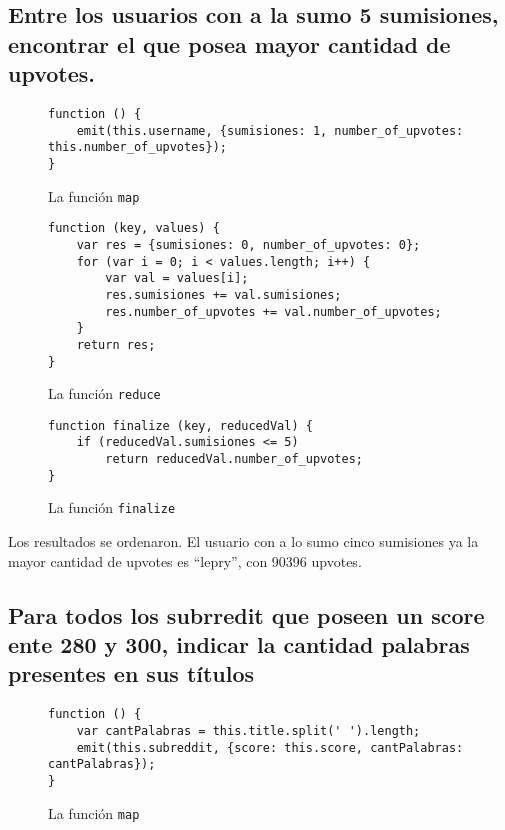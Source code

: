 \documentclass[11pt, a4paper, twoside]{article}
\begin{document}
\subsection{Entre los usuarios con a la sumo 5 sumisiones, encontrar el que posea mayor cantidad de upvotes.}

\begin{figure}[H]
\centering
\begin{verbatim}
function () {
    emit(this.username, {sumisiones: 1, number_of_upvotes: this.number_of_upvotes});
}
\end{verbatim}
\caption{La función \texttt{map}}
\end{figure}

\begin{figure}[H]
\centering
\begin{verbatim}
function (key, values) {
    var res = {sumisiones: 0, number_of_upvotes: 0};
    for (var i = 0; i < values.length; i++) {
        var val = values[i];
        res.sumisiones += val.sumisiones;
        res.number_of_upvotes += val.number_of_upvotes;
    }
    return res;
}
\end{verbatim}
\caption{La función \texttt{reduce}}
\end{figure}

\begin{figure}[H]
\centering
\begin{verbatim}
function finalize (key, reducedVal) {
    if (reducedVal.sumisiones <= 5)
        return reducedVal.number_of_upvotes;
}
\end{verbatim}
\caption{La función \texttt{finalize}}
\end{figure}

Los resultados se ordenaron. El usuario con a lo sumo cinco sumisiones ya la mayor cantidad de upvotes es ``lepry'', con 90396 upvotes.

\newpage
\subsection{Para todos los subrredit que poseen un score ente 280 y 300, indicar la cantidad palabras
presentes en sus títulos}

\begin{figure}[H]
\centering
\begin{verbatim}
function () {
    var cantPalabras = this.title.split(' ').length;
    emit(this.subreddit, {score: this.score, cantPalabras: cantPalabras});
}
\end{verbatim}
\caption{La función \texttt{map}}
\end{figure}
\end{document}
